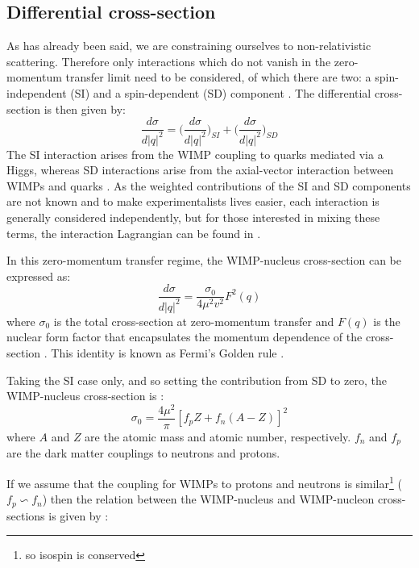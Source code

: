 \subsection{Differential cross-section}
\par
As has already been said, we are constraining ourselves to non-relativistic scattering.
Therefore only interactions which do not vanish in the zero-momentum transfer limit need to be considered, of which there are two: a spin-independent (SI) and a spin-dependent (SD) component \cite{wimp_lagrangian_ref}.
The differential cross-section is then given by:
\begin{equation}
    \frac{d\sigma}{d|q|^2} = \bigg(\frac{d\sigma}{d|q|^2}\bigg)_{SI} + \bigg(\frac{d\sigma}{d|q|^2}\bigg)_{SD}
\end{equation}
The SI interaction arises from the WIMP coupling to quarks mediated via a Higgs, whereas SD interactions arise from the axial-vector interaction between WIMPs and quarks \cite{supersymmetric_dark_matter_ref}.
As the weighted contributions of the SI and SD components are not known and to make experimentalists lives easier, each interaction is generally considered independently, but for those interested in mixing these terms, the interaction Lagrangian can be found in \cite{wimp_lagrangian_ref}.
\par
In this zero-momentum transfer regime, the WIMP-nucleus cross-section can be expressed as:
\begin{equation}
    \frac{d\sigma}{d|q|^2} = \frac{\sigma_0}{4\mu^2 v^2} F^2(q)
\end{equation}
where $\sigma_0$ is the total cross-section at zero-momentum transfer and $F(q)$ is the nuclear form factor that encapsulates the momentum dependence of the cross-section \cite{shaunalsum_thesis_ref}.
This identity is known as Fermi's Golden rule \cite{shaunalsum_thesis_ref}.
\par
Taking the SI case only, and so setting the contribution from SD to zero, the WIMP-nucleus cross-section is \cite{supersymetry_wimpy_again_ref}:
\begin{equation}
    \sigma_0 = \frac{4\mu^2}{\pi} [f_pZ + f_n (A-Z)]^2
\end{equation}
where $A$ and $Z$ are the atomic mass and atomic number, respectively.
$f_n$ and $f_p$ are the dark matter couplings to neutrons and protons.
\par
If we assume that the coupling for WIMPs to protons and neutrons is similar\footnote{so isospin is conserved} ($f_p \backsim f_n$) then the relation between the WIMP-nucleus and WIMP-nucleon cross-sections is given by \cite{wimp_sd_form_factor_ref}:
